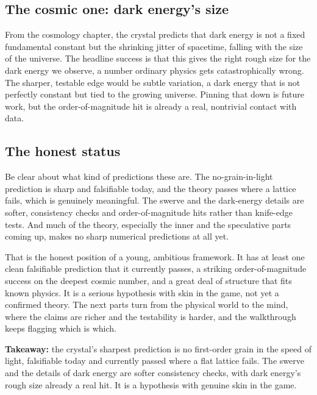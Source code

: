 \subsection{The cosmic one: dark energy's size}

From the cosmology chapter, the crystal predicts that dark energy is not a fixed fundamental constant but the shrinking jitter of spacetime, falling with the size of the universe. The headline success is that this gives the right rough size for the dark energy we observe, a number ordinary physics gets catastrophically wrong. The sharper, testable edge would be subtle variation, a dark energy that is not perfectly constant but tied to the growing universe. Pinning that down is future work, but the order-of-magnitude hit is already a real, nontrivial contact with data.

\subsection{The honest status}

Be clear about what kind of predictions these are. The no-grain-in-light prediction is sharp and falsifiable today, and the theory passes where a lattice fails, which is genuinely meaningful. The swerve and the dark-energy details are softer, consistency checks and order-of-magnitude hits rather than knife-edge tests. And much of the theory, especially the inner and the speculative parts coming up, makes no sharp numerical predictions at all yet.

That is the honest position of a young, ambitious framework. It has at least one clean falsifiable prediction that it currently passes, a striking order-of-magnitude success on the deepest cosmic number, and a great deal of structure that fits known physics. It is a serious hypothesis with skin in the game, not yet a confirmed theory. The next parts turn from the physical world to the mind, where the claims are richer and the testability is harder, and the walkthrough keeps flagging which is which.

\textbf{Takeaway:} the crystal's sharpest prediction is no first-order grain in the speed of light, falsifiable today and currently passed where a flat lattice fails. The swerve and the details of dark energy are softer consistency checks, with dark energy's rough size already a real hit. It is a hypothesis with genuine skin in the game.
